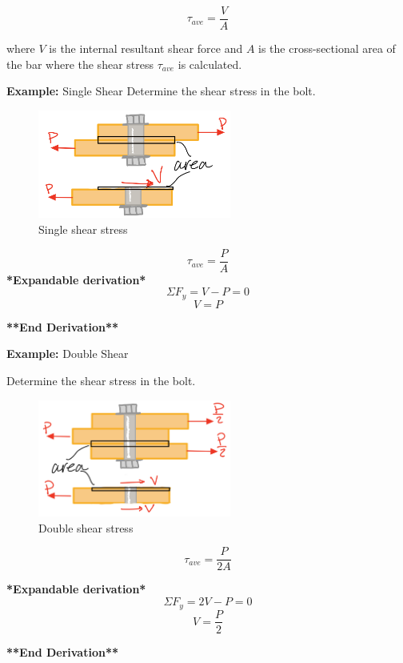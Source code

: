 \[\tau_{ave} = \frac{V}{A}\]

\noindent where $V$ is the internal resultant shear force and $A$ is the cross-sectional area of the bar where the shear stress $\tau_{ave}$ is calculated.


\vspace{5pt}

\noindent \textbf{Example:} Single Shear
Determine the shear stress in the bolt.
\begin{figure}[!h]
\centering
\includegraphics[angle=0, width=2.5in]{Stress-Figures/SingleShear.png}
\vspace{-2mm}
\caption{\small Single shear stress}
\vspace{-3mm}
\label{Fig:SingleShearStress}
\end{figure}

\[\tau_{ave} = \frac{P}{A}\]
\noindent \textbf{*Expandable derivation*}
\[\Sigma F_y = V-P = 0\]
\[V = P\]

\noindent \textbf{**End Derivation**}

\noindent \textbf{Example:} Double Shear

Determine the shear stress in the bolt.
\begin{figure}[!h]
\centering
\includegraphics[angle=0, width=2.5in]{Stress-Figures/DoubleShear.png}
\vspace{-2mm}
\caption{\small Double shear stress}
\vspace{-3mm}
\label{Fig:DoubleShearStress}
\end{figure}

\[\tau_{ave} = \frac{P}{2A}\]

\textbf{*Expandable derivation*}
\[\Sigma F_y = 2V-P = 0\]
\[V = \frac{P}{2}\]

\noindent \textbf{**End Derivation**}

